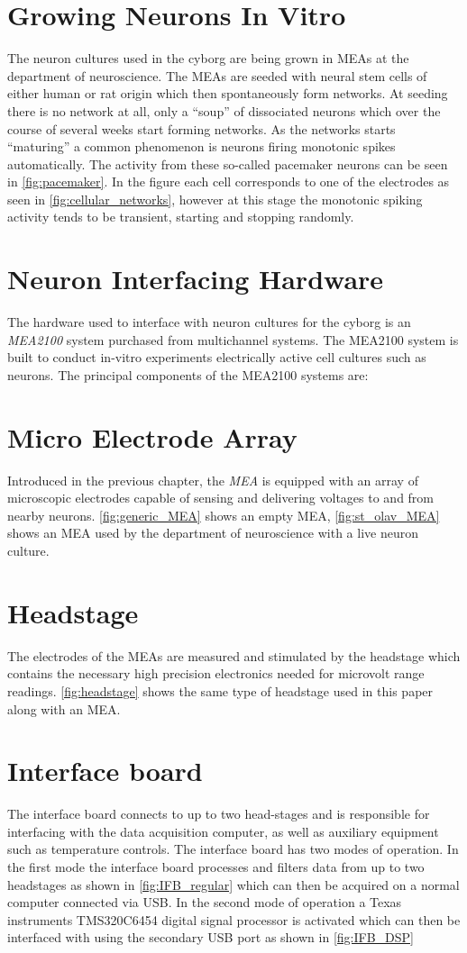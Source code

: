\section{Growing Neurons In Vitro}
The neuron cultures used in the cyborg are being grown in MEAs
at the department of neuroscience.
The MEAs are seeded with neural stem cells of either human or rat origin which
then spontaneously form networks.
At seeding there is no network at all, only a ``soup'' of dissociated neurons
which over the course of several weeks start forming networks.
As the networks starts ``maturing'' a common phenomenon is neurons firing
monotonic spikes automatically.
The activity from these so-called pacemaker neurons can be seen in \ref{fig:pacemaker}.
In the figure each cell corresponds to one of the electrodes as seen in
\ref{fig:cellular_networks}, however at this stage the monotonic spiking
activity tends to be transient, starting and stopping randomly.
\section{Neuron Interfacing Hardware}
The hardware used to interface with neuron cultures for the cyborg is an
\textit{MEA2100} system purchased from multichannel systems. 
The MEA2100 system is built to conduct in-vitro experiments electrically active
cell cultures such as neurons.
The principal components of the MEA2100 systems are:
\section{Micro Electrode Array}
Introduced in the previous chapter, the \textit{MEA} is equipped with an array
of microscopic electrodes capable of sensing and delivering voltages to and from
nearby neurons.
\ref{fig:generic_MEA} shows an empty MEA,
\ref{fig:st_olav_MEA} shows an MEA used by the department of neuroscience with a live neuron culture.
\section{Headstage}
The electrodes of the MEAs are measured and stimulated by the headstage which
contains the necessary high precision electronics needed for microvolt range readings.
\ref{fig:headstage} shows the same type of headstage used in this paper along
with an MEA.
\section{Interface board}
The interface board connects to up to two head-stages and is responsible for interfacing
with the data acquisition computer, as well as auxiliary equipment such as temperature
controls.
The interface board has two modes of operation.
In the first mode the interface board processes and filters data from up to two
headstages as shown in \ref{fig:IFB_regular} which can then be acquired on a normal
computer connected via USB.
In the second mode of operation a Texas instruments TMS320C6454 digital signal
processor is activated which can then be interfaced with using the secondary USB
port as shown in \ref{fig:IFB_DSP}
